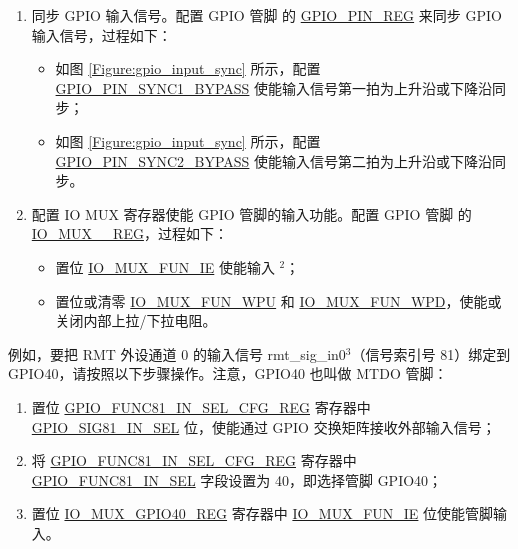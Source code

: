 \documentclass[main\_\_CN.tex]{subfiles}
\begin{document}
\begin{enumerate}
        \item 同步 GPIO 输入信号。配置 GPIO 管脚  的 \hyperref[regdesc:GPIOPINNREG]{GPIO\_PIN\_REG} 来同步 GPIO 输入信号，过程如下：
    \begin{itemize}
        \item 如图 \ref{Figure:gpio_input_sync} 所示，配置 \hyperref[fielddesc:GPIOPINNSYNC1BYPASS]{GPIO\_PIN\_SYNC1\_BYPASS} 使能输入信号第一拍为上升沿或下降沿同步；
    \item 如图 \ref{Figure:gpio_input_sync} 所示，配置 \hyperref[fielddesc:GPIOPINNSYNC2BYPASS]{GPIO\_PIN\_SYNC2\_BYPASS} 使能输入信号第二拍为上升沿或下降沿同步。
    \end{itemize}
    \item 配置 IO MUX 寄存器使能 GPIO 管脚的输入功能。配置 GPIO 管脚  的 \hyperref[regdesc:IOMUXnREG]{IO\_MUX\_\_REG}，过程如下：
    \begin{itemize}
        \item 置位 \hyperref[fielddesc:IOMUXFUNIE]{IO\_MUX\_FUN\_IE} 使能输入 \hyperref[input-note-2]{$^2$}；
        \item 置位或清零 \hyperref[fielddesc:IOMUXFUNWPU]{IO\_MUX\_FUN\_WPU} 和 \hyperref[fielddesc:IOMUXFUNWPD]{IO\_MUX\_FUN\_WPD}，使能或关闭内部上拉/下拉电阻。
    \end{itemize}
\end{enumerate}

例如，要把 RMT 外设通道 0 的输入信号 rmt\_sig\_in0\hyperref[input-note-3]{$^3$}（信号索引号 81）绑定到 GPIO40，请按照以下步骤操作。注意，GPIO40 也叫做 MTDO 管脚：
\begin{enumerate}
\item 置位 \hyperref[regdesc:GPIOFUNCNINSELCFGREG]{GPIO\_FUNC81\_IN\_SEL\_CFG\_REG} 寄存器中 \hyperref[fielddesc:GPIOSIGNINSEL]{GPIO\_SIG81\_IN\_SEL} 位，使能通过 GPIO 交换矩阵接收外部输入信号；
\item 将 \hyperref[regdesc:GPIOFUNCNINSELCFGREG]{GPIO\_FUNC81\_IN\_SEL\_CFG\_REG} 寄存器中 \hyperref[fielddesc:GPIOFUNCNINSEL]{GPIO\_FUNC81\_IN\_SEL} 字段设置为 40，即选择管脚 GPIO40；
\item 置位 \hyperref[regdesc:IOMUXnREG]{IO\_MUX\_GPIO40\_REG} 寄存器中 \hyperref[fielddesc:IOMUXFUNIE]{IO\_MUX\_FUN\_IE} 位使能管脚输入。
\end{enumerate}
\end{document}

